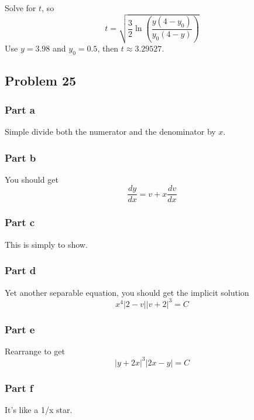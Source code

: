 \documentclass[12pt]{article}
\begin{document}
Solve for \(t\), so
\begin{equation*}
  t = \sqrt{\frac{3}{2} \ln\left(\frac{y(4-y_0)}{y_0(4-y)}\right)}
\end{equation*}
Use \(y = 3.98\) and \(y_0 = 0.5\), then \(t \approx 3.29527\).
\subsection*{Problem 25}
\label{sec:org6838405}
\subsubsection*{Part a}
\label{sec:org92a42dc}
Simple divide both the numerator and the denominator by \(x\).
\subsubsection*{Part b}
\label{sec:org8021f35}
You should get
\begin{equation*}
        \frac{dy}{dx} = v + x \frac{dv}{dx}
\end{equation*}
\subsubsection*{Part c}
\label{sec:orgd8ee6e7}
This is simply to show.
\subsubsection*{Part d}
\label{sec:org2b2c032}
Yet another separable equation, you should get the implicit solution
\begin{equation*}
  x^4 \left| 2 - v \right| \left| v + 2 \right|^3 = C
\end{equation*}
\subsubsection*{Part e}
\label{sec:orgd5fa113}
Rearrange to get
\begin{equation*}
        |y+2x|^3 |2x-y| = C
\end{equation*}
\subsubsection*{Part f}
\label{sec:org5b0d002}
It's like a 1/x star. 
\end{document}

